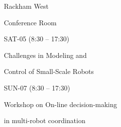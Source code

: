 \documentclass{article}
\begin{document}
\rssheader[2in]

\rssbig
\begin{center}
Rackham West \par \noindent Conference Room
\end{center}

\vfill

\rssmed
\begin{center}
SAT-05 (8:30 -- 17:30)
\end{center}

\rsssm
\begin{center}
Challenges in Modeling and \par \noindent Control of Small-Scale Robots
\end{center}

\vfill

\rssmed
\begin{center}
SUN-07 (8:30 -- 17:30)
\end{center}

\rsssm
\begin{center}
Workshop on On-line decision-making \par \noindent in multi-robot coordination
\end{center}

\vfill
\end{document}
